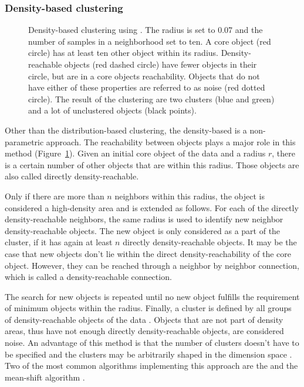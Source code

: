 \documentclass[12pt,a4paper,english]{article}
\begin{document}
\subsubsection*{Density-based clustering}
   	\begin{figure}
   		\vspace*{-55pt}
		\centering
		\def\svgwidth{0.5\textwidth}
		
		\caption[Density-based clustering.]{Density-based clustering using \dbscan \citep{dbscan:96}. The radius is set to 0.07 and the number of samples in a neighborhood set to ten. A core object (red circle) has at least ten other object within its radius. Density-reachable objects (red dashed circle) have fewer objects in their circle, but are in a core objects reachability. Objects that do not have either of these properties are referred to as noise (red dotted circle). The result of the clustering are two clusters (blue and green) and a lot of unclustered objects (black points).}
		
		\label{img:density}
	\end{figure}
    Other than the distribution-based clustering, the density-based is a non-parametric approach. The reachability between objects plays a major role in this method (Figure~\ref{img:density}).
	Given an initial core object of the data and a radius $r$, there is a certain number of other objects that are within this radius. Those objects are also called directly density-reachable. 

	Only if there are more than $n$ neighbors within this radius, the object is considered a high-density area and is extended as follows. For each of the directly density-reachable neighbors, the same radius is used to identify new neighbor density-reachable objects. 
	The new object is only considered as a part of the cluster, if it has again at least $n$ directly density-reachable objects.
	It may be the case that new objects don't lie within the direct density-reachability of the core object. However, they can be reached through a neighbor by neighbor connection, which is called a density-reachable connection. 

	The search for new objects is repeated until no new object fulfills the requirement of minimum objects within the radius.
	Finally, a cluster is defined by all groups of density-reachable objects of the data \citep{density-based:05}.
	Objects that are not part of density areas, thus have not enough directly density-reachable objects, are considered noise.
	An advantage of this method is that the number of clusters doesn't have to be specified and the clusters may be arbitrarily shaped in the dimension space \citep{density-based:11}.
	Two of the most common algorithms implementing this approach are the \dbscan \citep{dbscan:96} and the mean-shift algorithm \citep{mean-shift:95}.\\
\end{document}
